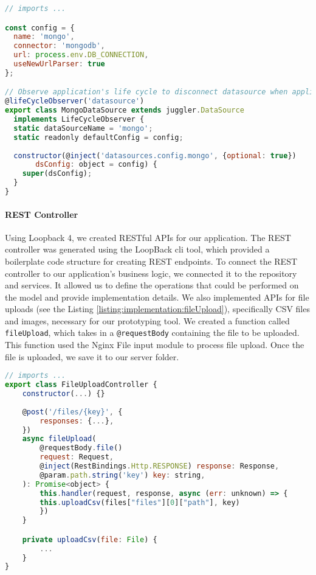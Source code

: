 \begin{lstlisting}[language=JavaScript, caption=lb-4-mongo.datasource.ts, label=listing:implementation:lb4Mongo]
// imports ...

const config = {
  name: 'mongo',
  connector: 'mongodb',
  url: process.env.DB_CONNECTION,
  useNewUrlParser: true
};

// Observe application's life cycle to disconnect datasource when application is stopped
@lifeCycleObserver('datasource')
export class MongoDataSource extends juggler.DataSource
  implements LifeCycleObserver {
  static dataSourceName = 'mongo';
  static readonly defaultConfig = config;
    
  constructor(@inject('datasources.config.mongo', {optional: true})
       dsConfig: object = config) {
    super(dsConfig);
  }
}
\end{lstlisting}

\paragraph{REST Controller}
Using Loopback 4, we created RESTful APIs for our application. 
The REST controller was generated using the LoopBack \ac{cli} tool, which provided a boilerplate code structure for creating REST endpoints.
To connect the REST controller to our application's business logic, we connected it to the repository and services. 
It allowed us to define the operations that could be performed on the model and provide implementation details.
We also implemented APIs for file uploads (see the Listing \ref{listing:implementation:fileUpload}), specifically CSV files and images, necessary for our prototyping tool. 
We created a function called \texttt{fileUpload}, which takes in a \texttt{@requestBody} containing the file to be uploaded. 
This function used the Nginx File input module to process file upload. 
Once the file is uploaded, we save it to our server folder.

\begin{lstlisting}[language=JavaScript, caption=file-upload.controller.ts, label=listing:implementation:fileUpload]
// imports ...
export class FileUploadController {
    constructor(...) {}
    
    @post('/files/{key}', {
        responses: {...},
    })
    async fileUpload(
        @requestBody.file()
        request: Request,
        @inject(RestBindings.Http.RESPONSE) response: Response,
        @param.path.string('key') key: string,
    ): Promise<object> {
        this.handler(request, response, async (err: unknown) => {
        this.uploadCsv(files["files"][0]["path"], key)
        })
    }

    private uploadCsv(file: File) {
        ...
    }
}
\end{lstlisting}

